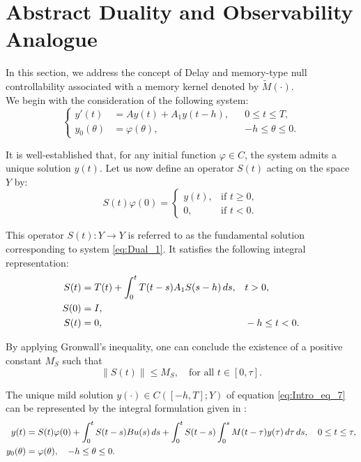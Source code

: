 \documentclass[12pt]{article}
\theoremstyle{plain}
\theoremstyle{definition}
\begin{document}
\section{Abstract Duality and Observability Analogue}

In this section, we address the concept of Delay and memory-type null controllability associated with a memory kernel denoted by $\widetilde{M}(\cdot)$.\\

We begin with the consideration of the following system:
\begin{equation}
\label{eq:Dual_1}
\left\{
\begin{aligned}
    y'(t) &= Ay(t) + A_1 y(t - h), && 0 \leq t \leq T, \\
    y_0(\theta) &= \varphi(\theta), && -h \leq \theta \leq 0.
\end{aligned}
\right.
\end{equation}

It is well-established that, for any initial function $\varphi \in C$, the system admits a unique solution $y(t)$. Let us now define an operator $S(t)$ acting on the space $Y$ by:
\[
S(t)\varphi(0) =
\begin{cases}
y(t), & \text{if } t \geq 0, \\
0, & \text{if } t < 0.
\end{cases}
\]

This operator $S(t): Y \to Y$ is referred to as the fundamental solution corresponding to system \eqref{eq:Dual_1}. It satisfies the following integral representation:
\begin{align}\label{eq:Dual_2}
    S(t) &= T(t) + \int_0^t T(t - s) A_1 S(s - h) \, ds, && t > 0, \notag \\
    S(0) &= I, \notag \\
    S(t) &= 0, && -h \leq t < 0.
\end{align}

By applying Gronwall's inequality, one can conclude the existence of a positive constant $M_S$ such that
\[
\|S(t)\| \leq M_S, \quad \text{for all } t \in [0, \tau].
\]

The unique mild solution $y(\cdot) \in C([-h, T]; Y)$ of equation \eqref{eq:Intro_eq_7} can be represented by the integral formulation given in \cite{wang2005approximate}:
\begin{align}\label{eq:Dual_3}
    y(t) &= S(t)\varphi(0) 
    + \int_0^t S(t - s) B u(s) \, ds + \int_0^t S(t - s) \int_0^s M(t - \tau)y(\tau) \, d\tau \, ds, \quad 0 \leq t \leq \tau, \notag \\
    y_0(\theta) &= \varphi(\theta), \quad -h \leq \theta \leq 0.
\end{align}
\end{document}
